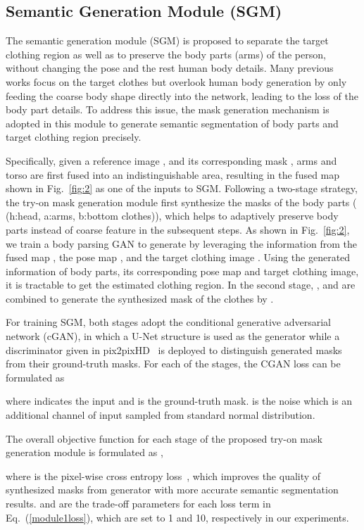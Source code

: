 \documentclass[10pt,twocolumn,letterpaper]{article}
\begin{document}
\subsection{Semantic Generation Module (SGM)}

The semantic generation module (SGM) is proposed to separate the target clothing region as well as to preserve the body parts (\ie arms) of the person, without changing the pose and the rest human body details.
Many previous works focus on the target clothes but overlook human body generation by only feeding the coarse body shape directly into the network, leading to the loss of the body part details. To address this issue, the mask generation mechanism is adopted in this module to generate semantic segmentation of body parts and target clothing region precisely.

Specifically, given a reference image , and its corresponding mask , arms  and torso  are first fused into an indistinguishable area, resulting in the fused map  shown in Fig.~\ref{fig:2} as one of the inputs to SGM.
Following a two-stage strategy, the try-on mask generation module first synthesize the masks of the body parts  ( (h:head, a:arms, b:bottom clothes)), which helps to adaptively preserve body parts instead of coarse feature in the subsequent steps.
As shown in Fig.~\ref{fig:2}, we train a body parsing GAN  to generate  by leveraging the information from the fused map , the pose map , and the target clothing  image . Using the generated information of body parts, its corresponding pose map and target clothing  image, it is tractable to get the estimated clothing region. In the second stage, ,  and  are combined to generate the synthesized mask of the clothes  by .




For training SGM, both stages adopt the conditional generative adversarial network (cGAN), in which a U-Net structure is used as the generator while a discriminator given in pix2pixHD~\cite{DBLP:conf/cvpr/Wang0ZTKC18} is deployed to distinguish generated masks from their ground-truth masks.
For each of the stages, the CGAN loss can be formulated as

where  indicates the input and  is the ground-truth mask.  is the noise which is an additional channel of input sampled from standard normal distribution.

The overall objective function for each stage of the proposed try-on mask generation module is formulated as ,

where  is the pixel-wise cross entropy loss~\cite{goodfellow2016deep}, which improves the quality of synthesized masks from generator with more accurate semantic segmentation results.  and  are the trade-off parameters for each loss term in Eq.~(\ref{module1loss}), which are set to 1 and 10, respectively in our experiments.
\end{document}
